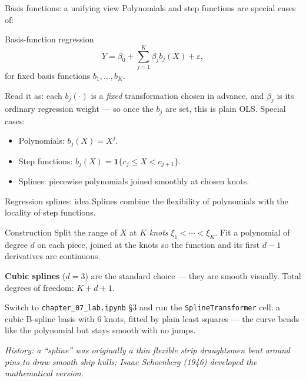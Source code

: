 \documentclass[aspectratio=169,11pt]{beamer}
\begin{document}
\begin{frame}{Basis functions: a unifying view}
  Polynomials and step functions are special cases of:
  \begin{block}{Basis-function regression}
    \[
      Y = \beta_0 + \sum_{j=1}^K \beta_j b_j(X) + \varepsilon,
    \]
    for fixed basis functions $b_1, \ldots, b_K$.
  \end{block}
  \begin{readme}
    Read it as: each $b_j(\cdot)$ is a \emph{fixed} transformation
    chosen in advance, and $\beta_j$ is its ordinary regression weight
    --- so once the $b_j$ are set, this is plain OLS. Special cases:
    \begin{itemize}
      \item Polynomials: $b_j(X) = X^j$.
      \item Step functions: $b_j(X) = \mathbf{1}\{c_j \le X < c_{j+1}\}$.
      \item Splines: piecewise polynomials joined smoothly at chosen
            knots.
    \end{itemize}
  \end{readme}
\end{frame}

\begin{frame}{Regression splines: idea}
  Splines combine the flexibility of polynomials with the locality of
  step functions.
  \begin{block}{Construction}
    Split the range of $X$ at $K$ \emph{knots}
    $\xi_1 < \cdots < \xi_K$. Fit a polynomial of degree $d$ on each
    piece, joined at the knots so the function and its first $d-1$
    derivatives are continuous.
  \end{block}
  \begin{takeaway}
    \textbf{Cubic splines} ($d = 3$) are the standard choice --- they
    are smooth visually. Total degrees of freedom: $K + d + 1$.
  \end{takeaway}
  \begin{labnote}
    Switch to \texttt{chapter\_07\_lab.ipynb} \S3 and run the \texttt{SplineTransformer} cell: a cubic B-spline basis with $6$ knots, fitted by plain least squares --- the curve bends like the polynomial but stays smooth with no jumps.
  \end{labnote}
  \par{\tiny\itshape\color{gray}History: a ``spline'' was originally a
  thin flexible strip draughtsmen bent around pins to draw smooth ship hulls;
  Isaac Schoenberg (1946) developed the mathematical version.}
\end{frame}
\end{document}
